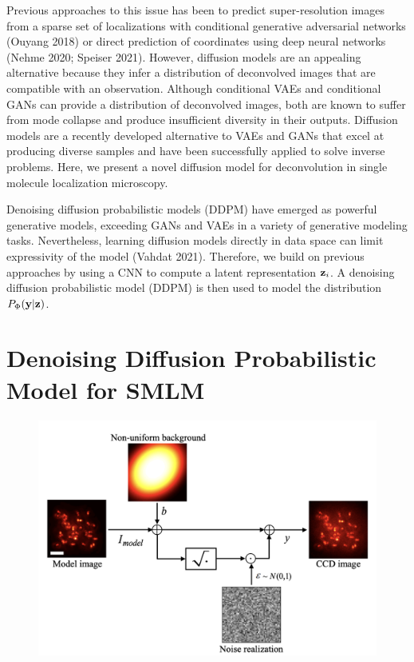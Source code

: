 \documentclass{article}
\begin{document}
Previous approaches to this issue has been to predict super-resolution images from a sparse set of localizations with conditional generative adversarial networks (Ouyang 2018) or direct prediction of coordinates using deep neural networks (Nehme 2020; Speiser 2021). However, diffusion models are an appealing alternative because they infer a distribution of deconvolved images that are compatible with an observation. Although conditional VAEs and conditional GANs can provide a distribution of deconvolved images, both are known to suffer from mode collapse and produce insufficient diversity in their outputs. Diffusion models are a recently developed alternative to VAEs and GANs that excel at producing diverse samples and have been successfully applied to solve inverse problems. Here, we present a novel diffusion model for deconvolution in single molecule localization microscopy.

Denoising diffusion probabilistic models (DDPM) have emerged as powerful generative models, exceeding GANs and VAEs in a variety of generative modeling tasks. Nevertheless, learning diffusion models directly in data space can limit expressivity of the model (Vahdat 2021). Therefore, we build on previous approaches by using a CNN to compute a latent representation $\bold{z}_{i}$. A denoising diffusion probabilistic model (DDPM) is then used to model the distribution $P_{\Phi}(\bold{y}|\bold{z})$. 



\section{Denoising Diffusion Probabilistic Model for SMLM}

\begin{figure}
\includegraphics[scale=0.5]{Generation.png}
\end{figure}
\end{document}
